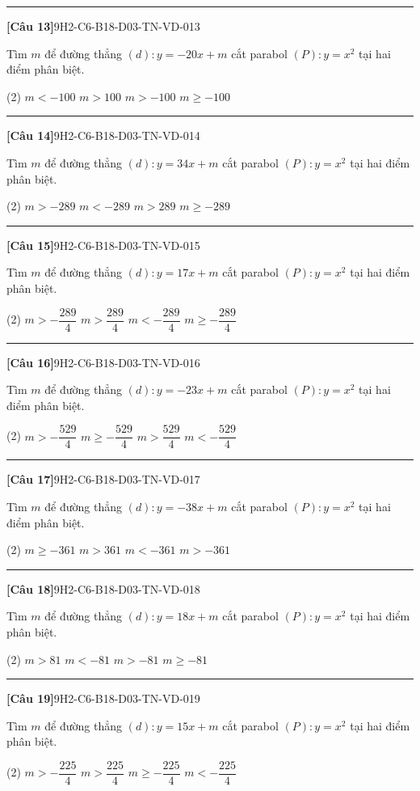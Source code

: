 \documentclass[12pt,a4paper]{article}
\newif\ifloigiai
\newenvironment{cauhoi}[2]{%
  \par\medskip\noindent\rule{\textwidth}{0.4pt}\par\nopagebreak
  \noindent\textbf{[#1]}\hfill{\scriptsize\ttfamily #2}\par\nopagebreak\smallskip}{\par}
\newcommand{\dapan}[1]{\ifloigiai\par\smallskip\noindent\textit{Đáp án:} \textbf{#1}\par\fi}
\begin{document}
\begin{cauhoi}{Câu 13}{9H2-C6-B18-D03-TN-VD-013}
Tìm $m$ để đường thẳng $(d): y=-20x+m$ cắt parabol $(P): y=x^{2}$ tại hai điểm phân biệt.
\begin{tasks}(2)
\task $m<-100$
\task $m>100$
\task $m>-100$
\task $m\ge -100$
\end{tasks}
\dapan{C}
\end{cauhoi}
\begin{cauhoi}{Câu 14}{9H2-C6-B18-D03-TN-VD-014}
Tìm $m$ để đường thẳng $(d): y=34x+m$ cắt parabol $(P): y=x^{2}$ tại hai điểm phân biệt.
\begin{tasks}(2)
\task $m>-289$
\task $m<-289$
\task $m>289$
\task $m\ge -289$
\end{tasks}
\dapan{A}
\end{cauhoi}
\begin{cauhoi}{Câu 15}{9H2-C6-B18-D03-TN-VD-015}
Tìm $m$ để đường thẳng $(d): y=17x+m$ cắt parabol $(P): y=x^{2}$ tại hai điểm phân biệt.
\begin{tasks}(2)
\task $m>-\dfrac{289}{4}$
\task $m>\dfrac{289}{4}$
\task $m<-\dfrac{289}{4}$
\task $m\ge -\dfrac{289}{4}$
\end{tasks}
\dapan{A}
\end{cauhoi}
\begin{cauhoi}{Câu 16}{9H2-C6-B18-D03-TN-VD-016}
Tìm $m$ để đường thẳng $(d): y=-23x+m$ cắt parabol $(P): y=x^{2}$ tại hai điểm phân biệt.
\begin{tasks}(2)
\task $m>-\dfrac{529}{4}$
\task $m\ge -\dfrac{529}{4}$
\task $m>\dfrac{529}{4}$
\task $m<-\dfrac{529}{4}$
\end{tasks}
\dapan{A}
\end{cauhoi}
\begin{cauhoi}{Câu 17}{9H2-C6-B18-D03-TN-VD-017}
Tìm $m$ để đường thẳng $(d): y=-38x+m$ cắt parabol $(P): y=x^{2}$ tại hai điểm phân biệt.
\begin{tasks}(2)
\task $m\ge -361$
\task $m>361$
\task $m<-361$
\task $m>-361$
\end{tasks}
\dapan{D}
\end{cauhoi}
\begin{cauhoi}{Câu 18}{9H2-C6-B18-D03-TN-VD-018}
Tìm $m$ để đường thẳng $(d): y=18x+m$ cắt parabol $(P): y=x^{2}$ tại hai điểm phân biệt.
\begin{tasks}(2)
\task $m>81$
\task $m<-81$
\task $m>-81$
\task $m\ge -81$
\end{tasks}
\dapan{C}
\end{cauhoi}
\begin{cauhoi}{Câu 19}{9H2-C6-B18-D03-TN-VD-019}
Tìm $m$ để đường thẳng $(d): y=15x+m$ cắt parabol $(P): y=x^{2}$ tại hai điểm phân biệt.
\begin{tasks}(2)
\task $m>-\dfrac{225}{4}$
\task $m>\dfrac{225}{4}$
\task $m\ge -\dfrac{225}{4}$
\task $m<-\dfrac{225}{4}$
\end{tasks}
\dapan{A}
\end{cauhoi}
\end{document}
